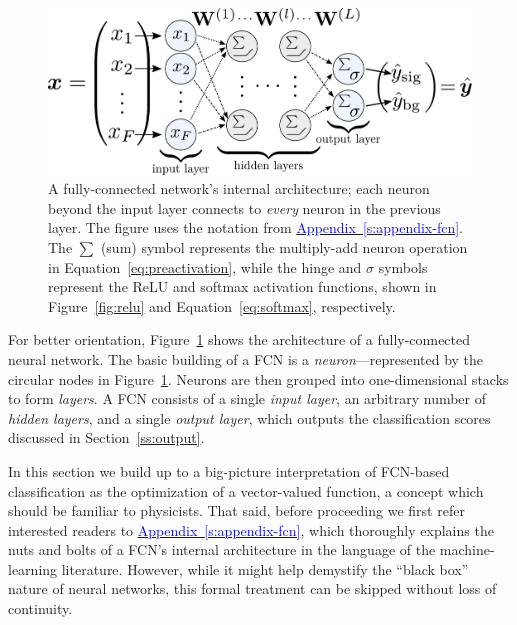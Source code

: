 \documentclass[11pt, a4paper]{article}
\newcommand{\myhref}[2]{\hyperref[#1]{\textcolor{blue}{#2}}}
\begin{document}
\begin{figure}[htb!]
    \centering
    \includegraphics[width=0.95\linewidth]{vector/fcn-architecture.pdf}
    \caption{A fully-connected network's internal architecture; each neuron beyond the input layer connects to \textit{every} neuron in the previous layer.
    The figure uses the notation from \myhref{s:appendix-fcn}{Appendix~\ref{s:appendix-fcn}}.
    The $ \sum $ (sum) symbol represents the multiply-add neuron operation in Equation~\ref{eq:preactivation}, while the hinge and $ \sigma $ symbols represent the ReLU and softmax activation functions, shown in Figure~\ref{fig:relu} and Equation~\ref{eq:softmax}, respectively.}
    \label{fig:fcn-architecture}
\end{figure}

For better orientation, Figure~\ref{fig:fcn-architecture} shows the architecture of a fully-connected neural network.
The basic building of a FCN is a \textit{neuron}---represented by the circular nodes in Figure~\ref{fig:fcn-architecture}.
Neurons are then grouped into one-dimensional stacks to form \textit{layers}.
A FCN consists of a single \textit{input layer}, an arbitrary number of \textit{hidden layers}, and a single \textit{output layer}, which outputs the classification scores discussed in Section~\ref{ss:output}.

In this section we build up to a big-picture interpretation of FCN-based classification as the optimization of a vector-valued function, a concept which should be familiar to physicists.
That said, before proceeding we first refer interested readers to \myhref{s:appendix-fcn}{Appendix~\ref{s:appendix-fcn}}, which thoroughly explains the nuts and bolts of a FCN's internal architecture in the language of the machine-learning literature.
However, while it might help demystify the ``black box'' nature of neural networks, this formal treatment can be skipped without loss of continuity.
\end{document}
